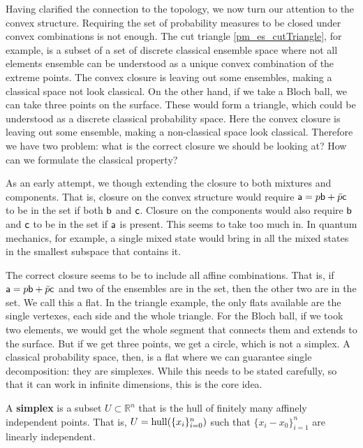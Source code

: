 Having clarified the connection to the topology, we now turn our attention to the convex structure. Requiring the set of probability measures to be closed under convex combinations is not enough. The cut triangle \ref{pm_es_cutTriangle}, for example, is a subset of a set of discrete classical ensemble space where not all elements ensemble can be understood as a unique convex combination of the extreme points. The convex closure is leaving out some ensembles, making a classical space not look classical. On the other hand, if we take a Bloch ball, we can take three points on the surface. These would form a triangle, which could be understood as a discrete classical probability space. Here the convex closure is leaving out some ensemble, making a non-classical space look classical. Therefore we have two problem: what is the correct closure we should be looking at? How can we formulate the classical property?

As an early attempt, we though extending the closure to both mixtures and components. That is, closure on the convex structure would require $\ens[a] = p \ens[b] + \bar{p} \ens[c]$ to be in the set if both $\ens[b]$ and $\ens[c]$. Closure on the components would also require $\ens[b]$ and $\ens[c]$ to be in the set if $\ens[a]$ is present. This seems to take too much in. In quantum mechanics, for example, a single mixed state would bring in all the mixed states in the smallest subspace that contains it.

The correct closure seems to be to include all affine combinations. That is, if $\ens[a] = p \ens[b] + \bar{p} \ens[c]$ and two of the ensembles are in the set, then the other two are in the set. We call this a flat. In the triangle example, the only flats available are the single vertexes, each side and the whole triangle. For the Bloch ball, if we took two elements, we would get the whole segment that connects them and extends to the surface. But if we get three points, we get a circle, which is not a simplex. A classical probability space, then, is a flat where we can guarantee single decomposition: they are simplexes. While this needs to be stated carefully, so that it can work in infinite dimensions, this is the core idea.


\begin{defn}
	A \textbf{simplex} is a subset $U \subset \mathbb{R}^n$ that is the hull of finitely many affinely independent points. That is, $U = \hull(\{x_i\}_{i=0}^{n})$ such that $\{x_i - x_0\}_{i=1}^{n}$ are linearly independent.
\end{defn}

